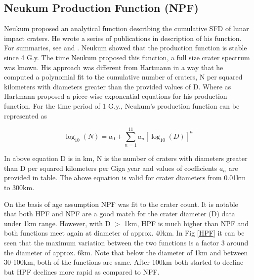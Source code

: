 \documentclass[11pt]{article}
\begin{document}
\subsection{Neukum Production Function (NPF)}
Neukum proposed an analytical function describing the cumulative SFD of lunar impact craters. He wrote a series of publications in description of his function. For summaries, see \cite{neukum1994crater} and \cite{neukum1983meteoritenbombardement}. Neukum showed that the production function is stable since 4 G.y. The time Neukum proposed this function, a full size crater spectrum was known. His approach was different from Hartmann in a way that he computed a polynomial fit to the cumulative number of craters, N per squared kilometers with diameters greater than the provided values of D. Where as Hartmann proposed a piece-wise exponential equations for his production function. For the time period of 1 G.y., Neukum's production function can be represented as

\begin{equation}
\log_{10} (N) = a_0 + \sum_{n=1}^{11} a_n[\log_{10} (D)]^n
\end{equation}

In above equation D is in km, N is the number of craters with diameters greater than D per squared kilometers per Giga year and values of coefficients $a_n$ are provided in table. The above equation is valid for crater diameters from 0.01km to 300km.

On the basis of age assumption NPF was fit to the crater count. It is notable that both HPF and NPF are a good match for the crater diameter (D) data under 1km range. However, with D $>$ 1km, HPF is much higher than NPF and both functions meet again at diameter of approx. 40km. In Fig \ref{HPF} it can be seen that the maximum variation between the two functions is a factor 3 around the diameter of approx. 6km. Note that below the diameter of 1km and between 30-100km, both of the functions are same. After 100km both started to decline but HPF declines more rapid as compared to NPF.
\end{document}
